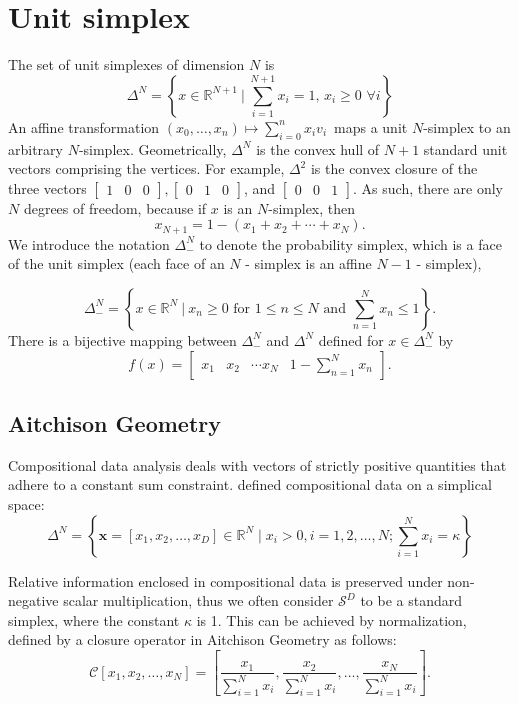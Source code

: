 \documentclass[11pt]{article}
\newcommand{\setcomp}[2]{\left\{ #1 \ \Big|\ #2 \right\}}
\begin{document}
\section{Unit simplex}

The set of unit simplexes of dimension $N$ is
\[
  \Delta^N = \setcomp{x \in \mathbb{R}^{N + 1}}{\sum_{i=1}^{N + 1} x_i = 1,\,x_i \ge 0 \, \, \forall i }
\]
An affine transformation $(x_0, \ldots, x_n) \mapsto \sum_{i=0}^n x_i v_i \,$ maps a unit $N$-simplex to an arbitrary $N$-simplex. Geometrically, $\Delta^N$ is the convex hull of $N+1$ standard unit vectors comprising the vertices.  For example, $\Delta^2$ is the convex closure of the three vectors
$\begin{bmatrix}1 & 0 & 0 \end{bmatrix},
\begin{bmatrix} 0 & 1 & 0 \end{bmatrix}$,
and $\begin{bmatrix} 0 & 0 & 1 \end{bmatrix}$. As such, there are only $N$ degrees of
freedom, because if $x$ is an $N$-simplex, then
\[
  x_{N+1} = 1 - (x_1 + x_2 + \cdots + x_N).
\]
We introduce the notation $\Delta^N_-$ to denote the probability simplex, which is a face of the unit simplex (each face of an $N$ - simplex is an affine $N-1$ - simplex),

\[
\Delta^N_-
= 
\setcomp{x \in \mathbb{R}^N}{x_n \geq 0 \textrm{ for } 1 \leq n \leq N \textrm{ and } \sum_{n=1}^N x_n \leq 1}.
\]
There is a bijective mapping between $\Delta^N_-$ and $\Delta^N$ defined for $x \in \Delta^N_-$ by 
\[
f(x) = \begin{bmatrix} x_1 & x_2 & \cdots x_N & 1 - \sum_{n=1}^N x_n \end{bmatrix}.
\]

\subsection{Aitchison Geometry}

Compositional data analysis deals with vectors of strictly positive quantities that adhere to a constant sum constraint. \cite{aitchison1982statistical} defined compositional data on a simplical space:
$$
\Delta^N=\left\{\mathbf{x}=\left[x_1, x_2, \ldots, x_D\right] \in \mathbb{R}^N \mid x_i>0, i=1,2, \ldots, N ; \sum_{i=1}^N x_i=\kappa\right\}
$$

Relative information enclosed in compositional data is preserved under non-negative scalar multiplication, thus we often consider $\mathcal{S}^D$ to be a standard simplex, where the constant $\kappa$ is 1. This can be achieved by normalization, defined by a closure operator in Aitchison Geometry as follows:
$$
\mathcal{C}\left[x_1, x_2, \ldots, x_N\right]=\left[\frac{x_1}{\sum_{i=1}^N x_i}, \frac{x_2}{\sum_{i=1}^N x_i}, \ldots, \frac{x_N}{\sum_{i=1}^N x_i}\right].
$$
\end{document}
